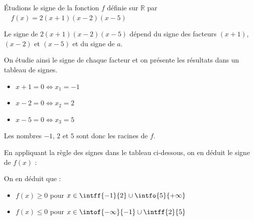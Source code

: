 \begin{methode}
	Étudions le signe de la fonction $f$ définie sur $\mathbb{R}$ par $\quad f(x)=2(x+1)(x-2)(x-5)$

	Le signe de $2(x+1)(x-2)(x-5)$ dépend du signe des facteurs $(x+1)$, $(x-2)$ et $(x-5)$ et du signe de $a$.

	On étudie ainsi le signe de chaque facteur et on présente les résultats dans un tableau de signes.
	\begin{itemize}
		\item $x+1=0 \iff x_1=-1$
		\item $x-2=0 \iff x_2=2$
		\item $x-5=0 \iff x_3=5$
	\end{itemize}

	Les nombres $-1$, $2$ et $5$ sont donc les racines de $f$.

	En appliquant la règle des signes dans le tableau ci-dessous, on en déduit le signe de $f(x)$ :

	\begin{center}
	\end{center}

	On en déduit que :
	\begin{itemize}
		\item $f(x) \ge 0$ pour $x \in \intff{-1}{2} \cup \intfo{5}{+\infty}$
		\item $f(x) \le 0$ pour $x \in \intof{-\infty}{-1} \cup \intff{2}{5}$
	\end{itemize}


\end{methode}
